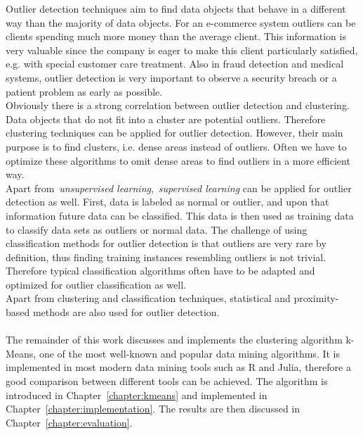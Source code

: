 Outlier detection techniques aim to find data objects that behave in a different way than the majority of data objects. For an e-commerce system outliers can be clients spending much more money than the average client. This information is very valuable since the company is eager to make this client particularly satisfied, e.g. with special customer care treatment. Also in fraud detection and medical systems, outlier detection is very important to observe a security breach or a patient problem as early as possible.
\\
Obviously there is a strong correlation between outlier detection and clustering. Data objects that do not fit into a cluster are potential outliers. Therefore clustering techniques can be applied for outlier detection. However, their main purpose is to find clusters, i.e. dense areas instead of outliers. Often we have to optimize these algorithms to omit dense areas to find outliers in a more efficient way.
\\
Apart from~\emph{unsupervised learning},~\emph{supervised learning} can be applied for outlier detection as well. First, data is labeled as normal or outlier, and upon that information future data can be classified. This data is then used as training data to classify data sets as outliers or normal data. The challenge of using classification methods for outlier detection is that outliers are very rare by definition, thus finding training instances resembling outliers is not trivial. Therefore typical classification algorithms often have to be adapted and optimized for outlier classification as well.
\\
Apart from clustering and classification techniques, statistical and proximity-based methods are also used for outlier detection.
\\
\\
The remainder of this work discusses and implements the clustering algorithm k-Means, one of the most well-known and popular data mining algorithms. It is implemented in most modern data mining tools such as R and Julia, therefore a good comparison between different tools can be achieved. The algorithm is introduced in Chapter~\ref{chapter:kmeans} and implemented in Chapter~\ref{chapter:implementation}. The results are then discussed in Chapter~\ref{chapter:evaluation}.

